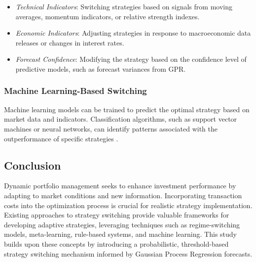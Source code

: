 \begin{itemize}
    \item \textit{Technical Indicators}: Switching strategies based on signals from moving averages, momentum indicators, or relative strength indexes.
    \item \textit{Economic Indicators}: Adjusting strategies in response to macroeconomic data releases or changes in interest rates.
    \item \textit{Forecast Confidence}: Modifying the strategy based on the confidence level of predictive models, such as forecast variances from GPR.
\end{itemize}

\subsubsection{Machine Learning-Based Switching}

Machine learning models can be trained to predict the optimal strategy based on market data and indicators. Classification algorithms, such as support vector machines or neural networks, can identify patterns associated with the outperformance of specific strategies \cite{fernandez2018machine}.

\subsection{Conclusion}

Dynamic portfolio management seeks to enhance investment performance by adapting to market conditions and new information. Incorporating transaction costs into the optimization process is crucial for realistic strategy implementation. Existing approaches to strategy switching provide valuable frameworks for developing adaptive strategies, leveraging techniques such as regime-switching models, meta-learning, rule-based systems, and machine learning. This study builds upon these concepts by introducing a probabilistic, threshold-based strategy switching mechanism informed by Gaussian Process Regression forecasts.




